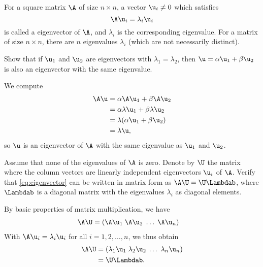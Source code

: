\label{ex:eigenvalue-decomposition}
For a square matrix $\A$ of size $n \times n$, a vector $\u_i
\neq 0$ which satisfies
\begin{equation}
  \A\u_i = \lambda_i \u_i
  \label{eq:eigenvector}
\end{equation}
is called a eigenvector of $\A$, and $\lambda_i$ is the corresponding
eigenvalue. For a matrix of size $n \times n$, there are $n$
eigenvalues $\lambda_i$ (which are not necessarily distinct).
\begin{exenumerate}
\item Show that if $\u_1$ and $\u_2$ are eigenvectors with $\lambda_1=\lambda_2$, then
  $\u = \alpha \u_1 +\beta \u_2$ is also an eigenvector with the same eigenvalue.
  \begin{solution}
    We compute
    \begin{align}
      \A\u &= \alpha \A\u_1 + \beta \A\u_2 \\
           &= \alpha \lambda \u_1 + \beta \lambda \u_2 \\
           &= \lambda(\alpha\u_1 + \beta\u_2) \\
           &= \lambda \u,
    \end{align}
    so $\u$ is an eigenvector of $\A$ with the same eigenvalue as $\u_1$ and $\u_2$.
  \end{solution}

\item Assume that none of the eigenvalues of $\A$ is zero. Denote by $\U$
  the matrix where the column vectors are linearly independent eigenvectors
  $\u_i$ of $\A$. Verify that \eqref{eq:eigenvector} can be written in matrix form as $\A\U=\U\Lambdab$, where $\Lambdab$ is a
  diagonal matrix with the eigenvalues $\lambda_i$ as diagonal elements.
 
  \begin{solution}
    By basic properties of matrix multiplication, we have
    \begin{align}
      \A\U &= (\A\u_1 \; \A\u_2 \;\ldots \; \A\u_n)
    \end{align}
    With $\A\u_i =\lambda_i \u_i$ for all $i = 1, 2, \ldots, n$, we thus obtain
    \begin{align}
      \A\U & = (\lambda_1\u_1 \; \lambda_2\u_2 \;\ldots \; \lambda_n\u_n) \\
           &= \U\Lambdab.
    \end{align}
  \end{solution}
  

\end{exenumerate}
